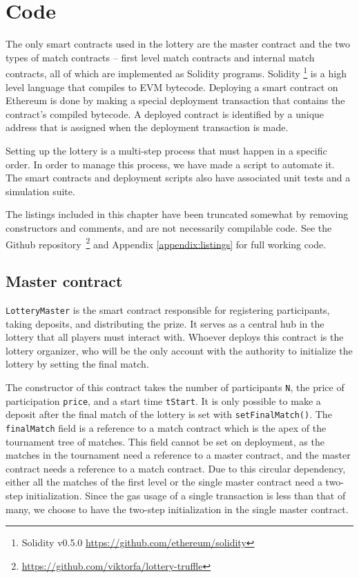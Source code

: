\section{Code}
\label{sec:code}

The only smart contracts used in the lottery are the master contract and the two types of match contracts – first level match contracts and internal match contracts, all of which are implemented as Solidity programs. Solidity \footnote{Solidity v0.5.0 \url{https://github.com/ethereum/solidity}} is a high level language that compiles to EVM bytecode. Deploying a smart contract on Ethereum is done by making a special deployment transaction that contains the contract's compiled bytecode. A deployed contract is identified by a unique address that is assigned when the deployment transaction is made.

Setting up the lottery is a multi-step process that must happen in a specific order. In order to manage this process, we have made a script to automate it. The smart contracts and deployment scripts also have associated unit tests and a simulation suite.

The listings included in this chapter have been truncated somewhat by removing constructors and comments, and are not necessarily compilable code. See the Github repository~\footnote{\url{https://github.com/viktorfa/lottery-truffle}} and Appendix \ref{appendix:listings} for full working code.

\subsection{Master contract}
\texttt{LotteryMaster} is the smart contract responsible for registering participants, taking deposits, and distributing the prize. It serves as a central hub in the lottery that all players must interact with. Whoever deploys this contract is the lottery organizer, who will be the only account with the authority to initialize the lottery by setting the final match. 

The constructor of this contract takes the number of participants \texttt{N}, the price of participation \texttt{price}, and a start time \texttt{tStart}. It is only possible to make a deposit after the final match of the lottery is set with \texttt{setFinalMatch()}. The \texttt{finalMatch} field is a reference to a match contract which is the apex of the tournament tree of matches. This field cannot be set on deployment, as the matches in the tournament need a reference to a master contract, and the master contract needs a reference to a match contract. Due to this circular dependency, either all the matches of the first level or the single master contract need a two-step initialization. Since the gas usage of a single transaction is less than that of many, we choose to have the two-step initialization in the single master contract.


